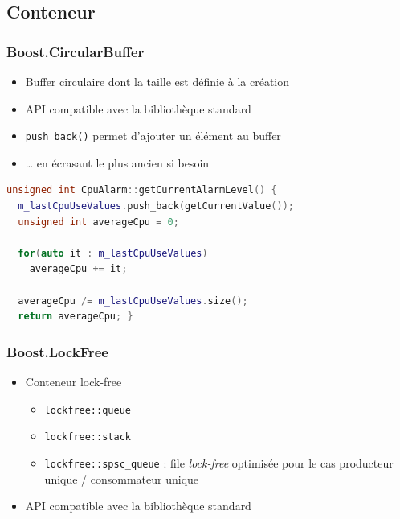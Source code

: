 \documentclass[C++.tex]{subfiles}
\begin{document}
\subsection*{Conteneur}
\begin{frame}[fragile]
	\frametitle{Boost.CircularBuffer}
	\begin{itemize}
		\item Buffer circulaire dont la taille est définie à la création
		\item API compatible avec la bibliothèque standard
		\item \lstinline|push_back()| permet d'ajouter un élément au buffer
		\item \ldots{} en écrasant le plus ancien si besoin
	\end{itemize}

	\begin{lstlisting}[language=C++]
unsigned int CpuAlarm::getCurrentAlarmLevel() {
  m_lastCpuUseValues.push_back(getCurrentValue());
  unsigned int averageCpu = 0;

  for(auto it : m_lastCpuUseValues)
    averageCpu += it;

  averageCpu /= m_lastCpuUseValues.size();
  return averageCpu; }\end{lstlisting}
\end{frame}

\begin{frame}[fragile]
	\frametitle{Boost.LockFree}
	\begin{itemize}
		\item Conteneur lock-free
		\begin{itemize}
			\item \lstinline|lockfree::queue|
			\item \lstinline|lockfree::stack|
			\item \lstinline|lockfree::spsc_queue| : file \textit{lock-free} optimisée pour le cas \og producteur unique / consommateur unique\fg{}
		\end{itemize}
		\item API compatible avec la bibliothèque standard
	\end{itemize}
\end{frame}
\end{document}
